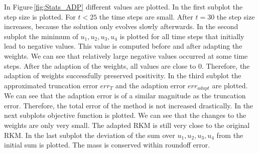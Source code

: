 \documentclass[a4paper]{article}
\numberwithin{equation}{section}
\theoremstyle{plain}
\theoremstyle{definition}
\numberwithin{theorem}{section}
\newcommand{\1}{\mathbbm{1}}
\begin{document}
In Figure\,\ref{fig:Stats_ADP} different values are plotted.  
In the first subplot the step size is plotted. For $t<25$ the time steps are small. After $t = 30$ the step size increases, because the solution only evolves slowly afterwards. 
In the second subplot the minimum of $u_1,u_2,u_3,u_4$ is plotted for all time steps that initially lead to negative values. This value is computed before and after adapting the weights.
We can see that relatively large negative values occurred at some time steps. 
After the adaption of the weights, all values are close to $0$. Therefore, the adaption of weights successfully preserved positivity. 
In the third subplot the approximated truncation error $err_T$ and the adaption error $err_{adapt}$ are plotted. 
We can see that the adaption error is of a similar magnitude as the truncation error. Therefore, the total error of the method is not increased drastically.  
In the next subplots objective function is plotted.  
We can see that the changes to the weights are only very small. The adapted RKM is still very close to the original RKM. 
In the last subplot the deviation of the sum over $u_1,u_2,u_3,u_4$ from the initial sum is plotted. 
The mass is conserved within roundoff error.
\end{document}
